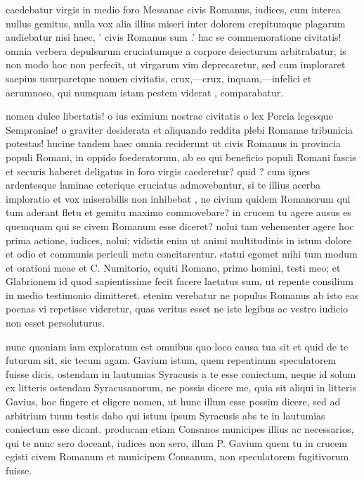  caedebatur virgis in medio foro Messanae civis Romanus, iudices, cum interea nullus gemitus, nulla vox alia illius miseri inter dolorem crepitumque plagarum audiebatur nisi haec, ' civis Romanus sum .' hac se commemoratione civitatis! omnia verbera depulsurum cruciatumque a corpore deiecturum arbitrabatur; is non modo hoc non perfecit, ut virgarum vim deprecaretur, sed cum imploraret saepius usurparetque nomen civitatis, crux,—crux, inquam,—infelici et aerumnoso, qui numquam istam pestem viderat , comparabatur.

 nomen dulce libertatis! o ius eximium nostrae civitatis o lex Porcia legesque Semproniae! o graviter desiderata et aliquando reddita plebi Romanae tribunicia potestas! hucine tandem haec omnia reciderunt ut civis Romanus in provincia populi Romani, in oppido foederatorum, ab eo qui beneficio populi Romani fascis et securis haberet deligatus in foro virgis caederetur? quid ? cum ignes ardentesque laminae ceterique cruciatus admovebantur, si te illius acerba imploratio et vox miserabilis non inhibebat , ne civium quidem Romanorum qui tum aderant fletu et gemitu maximo commovebare? in crucem tu agere ausus es quemquam qui se civem Romanum esse diceret? nolui tam vehementer agere hoc prima actione, iudices, nolui; vidistis enim ut animi multitudinis in istum dolore et odio et communis periculi metu concitarentur. statui egomet mihi tum modum et orationi meae et C. Numitorio, equiti Romano, primo homini, testi meo; et Glabrionem id quod sapientissime fecit facere laetatus sum, ut repente consilium in medio testimonio dimitteret. etenim verebatur ne populus Romanus ab isto eas poenas vi repetisse videretur, quas veritus esset ne iste legibus ac vestro iudicio non esset persoluturus.

 nunc quoniam iam exploratum est omnibus quo loco causa tua sit et quid de te futurum sit, sic tecum agam. Gavium istum, quem repentinum speculatorem fuisse dicis, ostendam in lautumias Syracusis a te esse coniectum, neque id solum ex litteris ostendam Syracusanorum, ne possis dicere me, quia sit aliqui in litteris Gavius, hoc fingere et eligere nomen, ut hunc illum esse possim dicere, sed ad arbitrium tuum testis dabo qui istum ipsum Syracusis abs te in lautumias coniectum esse dicant. producam etiam Consanos municipes illius ac necessarios, qui te nunc sero doceant, iudices non sero, illum P. Gavium quem tu in crucem egisti civem Romanum et municipem Consanum, non speculatorem fugitivorum fuisse.

